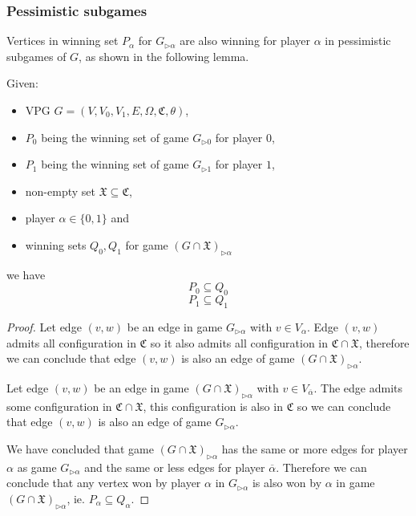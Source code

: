 \subsubsection{Pessimistic subgames}
Vertices in winning set $P_\alpha$ for $G_{\triangleright\alpha}$ are also winning for player $\alpha$ in pessimistic subgames of $G$, as shown in the following lemma.
\begin{lemma}
	\label{lem_pessimistic_subgames}
	Given:
	\begin{itemize}
		\item VPG $G = (V,V_0,V_1,E,\Omega, \mathfrak{C},\theta)$,
		\item $P_0$ being the winning set of game $G_{\triangleright0}$ for player $0$,
		\item $P_1$ being the winning set of game $G_{\triangleright1}$ for player $1$,
		\item non-empty set $\mathfrak{X} \subseteq \mathfrak{C}$,
		\item player $\alpha \in \{0,1\}$ and
		\item winning sets $Q_0,Q_1$ for game $(G \cap \mathfrak{X})_{\triangleright\alpha}$
	\end{itemize}
	we have
	\[ P_0 \subseteq Q_0 \]
	\[ P_1 \subseteq Q_1 \]
	\begin{proof}
		
		Let edge $(v,w)$ be an edge in game $G_{\triangleright\alpha}$ with $v \in V_\alpha$. Edge $(v,w)$ admits all configuration in $\mathfrak{C}$ so it also admits all configuration in $\mathfrak{C} \cap \mathfrak{X}$, therefore we can conclude that edge $(v,w)$ is also an edge of game $(G\cap \mathfrak{X})_{\triangleright\alpha}$.
		
		Let edge $(v,w)$ be an edge in game $(G \cap \mathfrak{X})_{\triangleright\alpha}$ with $v \in V_{\overline{\alpha}}$. The edge admits some configuration in $\mathfrak{C} \cap \mathfrak{X}$, this configuration is also in $\mathfrak{C}$ so we can conclude that edge $(v,w)$ is also an edge of game $G_{\triangleright\alpha}$.
		
		We have concluded that game $(G \cap \mathfrak{X})_{\triangleright\alpha}$ has the same or more edges for player $\alpha$ as game $G_{\triangleright\alpha}$ and the same or less edges for player $\overline{\alpha}$. Therefore we can conclude that any vertex won by player $\alpha$ in $G_{\triangleright\alpha}$ is also won by $\alpha$ in game $(G \cap \mathfrak{X})_{\triangleright\alpha}$, ie. $P_\alpha \subseteq Q_\alpha$.
		

\end{proof}
\end{lemma}
